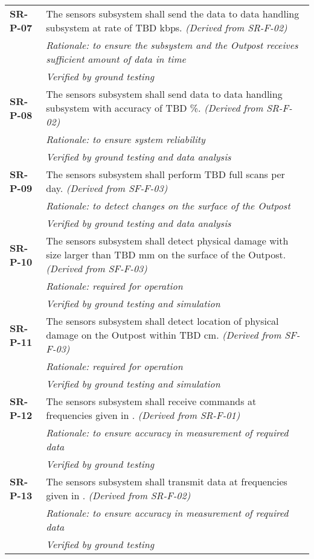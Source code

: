 \begin{longtable}{P{2cm}P{13.25cm}}
\textbf{SR-P-07}	& The sensors subsystem shall send the data to data handling subsystem at rate of \gls{TBD} \gls{kbps}. \textit{(Derived from SR-F-02)} \\
 & \textit{Rationale: to ensure the subsystem and the Outpost receives sufficient amount of data in time} \\
  & \textit{Verified by ground testing}		\\
  
\textbf{SR-P-08}	& The sensors subsystem shall send data to data handling subsystem with accuracy of \gls{TBD} \%. \textit{(Derived from SR-F-02)} \\
 & \textit{Rationale: to ensure system reliability} \\
 & \textit{Verified by ground testing and data analysis}	\\
 
\textbf{SR-P-09}	& The sensors subsystem shall perform \gls{TBD} full scans per day. \textit{(Derived from SF-F-03)} \\
 & \textit{Rationale: to detect changes on the surface of the Outpost} \\
 & \textit{Verified by ground testing and data analysis}			\\
 
\textbf{SR-P-10}	& The sensors subsystem shall detect physical damage with size larger than \gls{TBD} \gls{mm} on the surface of the Outpost. \textit{(Derived from SF-F-03)} \\
 & \textit{Rationale: required for operation} \\
 & \textit{Verified by ground testing and simulation}	\\
 
\textbf{SR-P-11}	& The sensors subsystem shall detect location of physical damage on the Outpost within \gls{TBD} \gls{cm}. \textit{(Derived from SF-F-03)} \\
 & \textit{Rationale: required for operation} \\
 & \textit{Verified by ground testing and simulation}	\\
 
\textbf{SR-P-12}	& The sensors subsystem shall receive commands at frequencies given in . \textit{(Derived from SR-F-01)} \\
 & \textit{Rationale: to ensure accuracy in measurement of required data} \\
 & \textit{Verified by ground testing}	\\
 
\textbf{SR-P-13}	& The sensors subsystem shall transmit data at frequencies given in . \textit{(Derived from SR-F-02)} \\
 & \textit{Rationale: to ensure accuracy in measurement of required data} \\
 & \textit{Verified by ground testing}	
\end{longtable}
